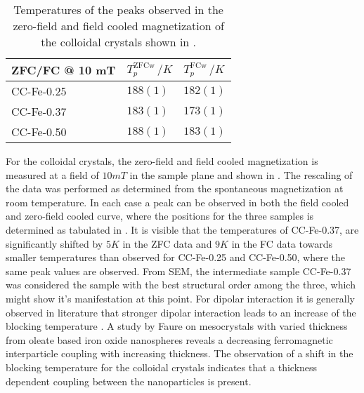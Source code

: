 \documentclass[\main/dresen_thesis.tex]{subfiles}
\begin{document}
    \begin{table}[!htbp]
      \centering
      \caption{\label{tab:colloidalCrystals:ZFCFC:parameters} Temperatures of the peaks observed in the zero-field and field cooled magnetization of the colloidal crystals shown in .}
      \begin{tabular}{ l | l | l}
        \rule{0pt}{2ex} \textbf{ZFC/FC @ 10 mT}
        & $T_p^\mathrm{ZFCw} \, / \unit{K}$
        & $T_p^\mathrm{FCw} \, / \unit{K}$\\
        \hline
        \rule{0pt}{2ex} CC-Fe-0.25    & $188(1)$   & $182(1)$\\
        \rule{0pt}{2ex} CC-Fe-0.37    & $183(1)$   & $173(1)$\\
        \rule{0pt}{2ex} CC-Fe-0.50    & $188(1)$   & $183(1)$\\
        \hline
      \end{tabular}
    \end{table}

    For the colloidal crystals, the zero-field and field cooled magnetization is measured at a field of $10 \unit{mT}$ in the sample plane and shown in .
    The rescaling of the data was performed as determined from the spontaneous magnetization at room temperature.
    In each case a peak can be observed in both the field cooled and zero-field cooled curve, where the positions for the three samples is determined as tabulated in .
    It is visible that the temperatures of CC-Fe-0.37, are significantly shifted by $5 \unit{K}$ in the ZFC data and $9 \unit{K}$ in the FC data towards smaller temperatures than observed for CC-Fe-0.25 and CC-Fe-0.50, where the same peak values are observed.
    From SEM, the intermediate sample CC-Fe-0.37 was considered the sample with the best structural order among the three, which might show it's manifestation at this point.
    For dipolar interaction it is generally observed in literature that stronger dipolar interaction leads to an increase of the blocking temperature \cite{Morup_2010_Magne, Pauly_2012_Sized, Otero_2000_Influ}.
    A study by Faure \etal \cite{Faure_2013_2Dto3} on mesocrystals with varied thickness from oleate based iron oxide nanospheres reveals a decreasing ferromagnetic interparticle coupling with increasing thickness.
    The observation of a shift in the blocking temperature for the colloidal crystals indicates that a thickness dependent coupling between the nanoparticles is present.
\end{document}
